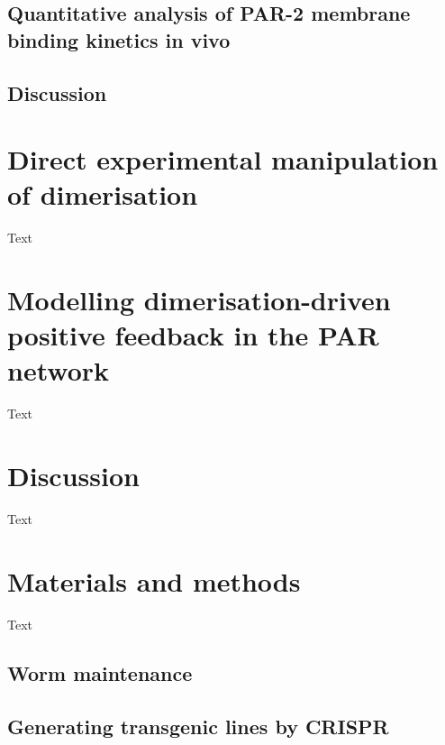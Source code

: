 \documentclass[12pt]{"article"}
\begin{document}
\subsection{Quantitative analysis of PAR-2 membrane binding kinetics in vivo}


\subsection{Discussion}

\clearpage
\section{Direct experimental manipulation of dimerisation}

Text

\clearpage
\section{Modelling dimerisation-driven positive feedback in the PAR network}

Text

\clearpage
\section{Discussion}

Text

\clearpage
\section{Materials and methods}

Text

\subsection{Worm maintenance}
\subsection{Generating transgenic lines by CRISPR}
\end{document}
